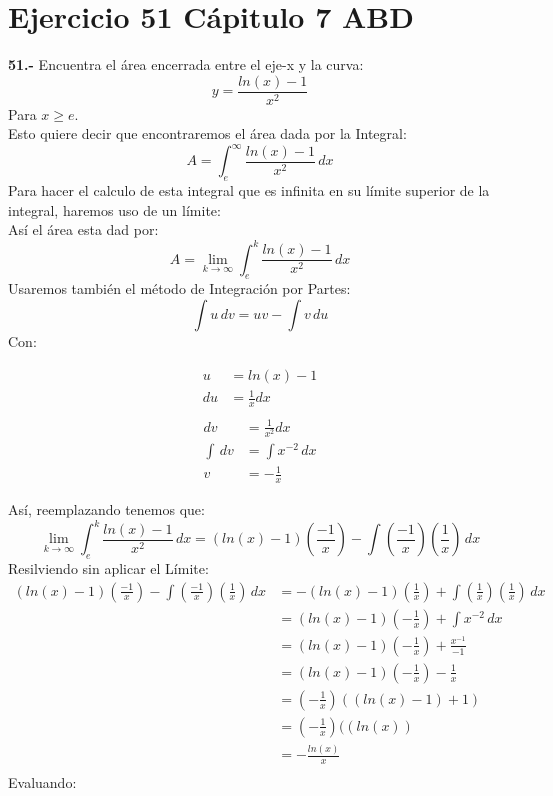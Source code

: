 \chapter*{Ejercicio 51 Cápitulo 7 ABD }

\textbf{51.-} Encuentra el área encerrada entre el eje-x y la curva:
\[
y = \frac{ln(x)-1}{x^{2}}
\]
Para $x \geq e$.\\
\newline
Esto quiere decir que encontraremos el área dada por la Integral:
\[
A = \int_{e}^{\infty} \frac{ln(x)-1}{x^{2}} \, dx
\]
Para hacer el calculo de esta integral que es infinita en su límite superior de la integral, haremos uso de un límite:\\
Así el área esta dad por:
\[
A = \lim_{k \rightarrow \infty}\int_{e}^{k} \frac{ln(x)-1}{x^{2}} \, dx
\]
Usaremos también el método de Integración por Partes:
\[
\int u \, dv = uv - \int v \, du 
\]
Con:
\begin{multicols}{2}
	\noindent
	\begin{align*}
		u &= ln(x)-1  \\
        du &= \frac{1}{x}dx \\
	\end{align*}
	\columnbreak
	\begin{align*}
	    dv &= \frac{1}{x^{2}}dx \\
        \int \, dv &= \int x^{-2} \,dx \\
        v &= -\frac{1}{x}
	\end{align*}
\end{multicols}
Así, reemplazando tenemos que:
\[
    \lim_{k \rightarrow \infty}\int_{e}^{k} \frac{ln(x)-1}{x^{2}} \, dx  = (ln(x)-1)(\frac{-1}{x}) - \int(\frac{-1}{x})(\frac{1}{x}) \, dx
\]
Resilviendo sin aplicar el Límite:
\begin{align*}
    (ln(x)-1)(\frac{-1}{x}) - \int(\frac{-1}{x})(\frac{1}{x}) \, dx &= -(ln(x)-1)(\frac{1}{x}) + \int(\frac{1}{x})(\frac{1}{x}) \, dx \\
    &= (ln(x)-1)(-\frac{1}{x}) + \int x^{-2}\, dx \\
    &= (ln(x)-1)(-\frac{1}{x}) + \frac{x^{-1}}{-1} \\
    &= (ln(x)-1)(-\frac{1}{x}) - \frac{1}{x} \\
    &= (-\frac{1}{x})((ln(x)-1) +1) \\
    &= (-\frac{1}{x})((ln(x)) \\
    &= -\frac{ln(x)}{x} \\
\end{align*}
Evaluando:
